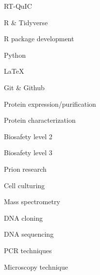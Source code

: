\documentclass{resume}
\begin{document}
        \begin{skills}
            \item RT-QuIC
            \item R \& Tidyverse
            \item R package development
            \item Python
            \item \LaTeX
            \item Git \& Github
            \item Protein expression/purification
            \item Protein characterization
            \item Biosafety level 2
            \item Biosafety level 3
            \item Prion research
            \item Cell culturing
            \item Mass spectrometry
            \item DNA cloning
            \item DNA sequencing
            \item PCR techniques
            \item Microscopy technique
        \end{skills}

    
\end{document}
